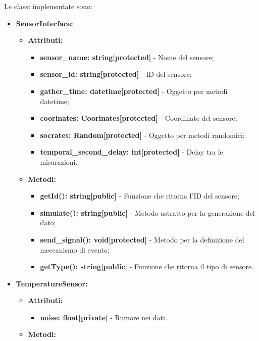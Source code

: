 \documentclass[8pt]{article}
\begin{document}
Le classi implementate sono:
\begin{itemize}
	\setlength\itemsep{0em}
    \item \textbf{SensorInterface:}
    \begin{itemize}
	\setlength\itemsep{0em}
        \item \textbf{Attributi:}
        \begin{itemize}
	\setlength\itemsep{0em}
            \item \textbf{sensor\_name: string[protected]} - Nome del sensore;
            \item \textbf{sensor\_id: string[protected]} - ID del sensore;
            \item \textbf{gather\_time: datetime[protected]} - Oggetto per metodi datetime;
            \item \textbf{coorinates: Coorinates[protected]} - Coordinate del sensore;
            \item \textbf{socrates: Random[protected]} - Oggetto per metodi randomici;
            \item \textbf{temporal\_second\_delay: int[protected]} - Delay tra le misurazioni.
        \end{itemize}
        \item \textbf{Metodi:}
        \begin{itemize}
	\setlength\itemsep{0em}
            \item \textbf{getId(): string[public]} - Funzione che ritorna l'ID del sensore;
            \item \textbf{simulate(): string[public]} - Metodo astratto per la generazione del dato;
            \item \textbf{send\_signal(): void[protected]} - Metodo per la definizione del meccanismo di evento;
            \item \textbf{getType(): string[public]} - Funzione che ritorna il tipo di sensore.
        \end{itemize}
    \end{itemize}
    \item \textbf{TemperatureSensor:}
    \begin{itemize}
	\setlength\itemsep{0em}
        \item \textbf{Attributi:}
        \begin{itemize}
	\setlength\itemsep{0em}
            \item \textbf{noise: float[private]} - Rumore nei dati.
        \end{itemize}
        \item \textbf{Metodi:}

\end{itemize}
\end{itemize}
\end{document}
